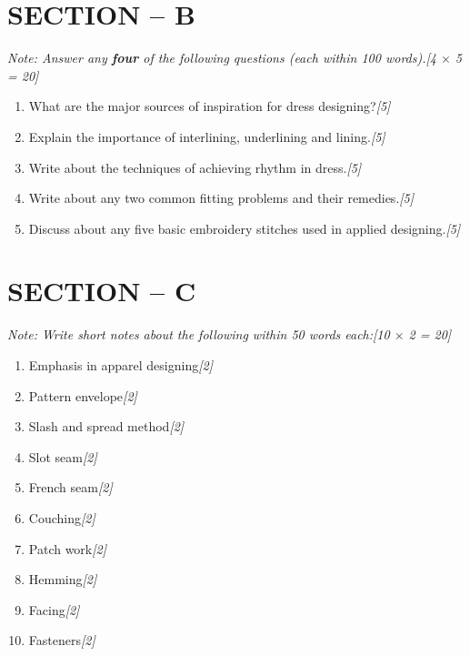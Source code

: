 \documentclass[11pt,a4paper]{article}
\newcommand{\pts}[1]{\hfill \textit{[#1]}}
\begin{document}
\bigskip

\section*{SECTION -- B}
\noindent \textit{Note: Answer any \textbf{four} of the following questions (each within 100 words).}\pts{4 $\times$ 5 = 20}

\begin{enumerate}[label=\textbf{\arabic*.},leftmargin=*,start=6,itemsep=8pt]

  \item What are the major sources of inspiration for dress designing?\pts{5}

  \item Explain the importance of interlining, underlining and lining.\pts{5}

  \item Write about the techniques of achieving rhythm in dress.\pts{5}

  \item Write about any two common fitting problems and their remedies.\pts{5}

  \item Discuss about any five basic embroidery stitches used in applied designing.\pts{5}

\end{enumerate}

\bigskip

\section*{SECTION -- C}
\noindent \textit{Note: Write short notes about the following within 50 words each:}\pts{10 $\times$ 2 = 20}

\begin{enumerate}[label=\textbf{11.}(\alph*),leftmargin=*,itemsep=6pt]

  \item Emphasis in apparel designing\pts{2}
  \item Pattern envelope\pts{2}
  \item Slash and spread method\pts{2}
  \item Slot seam\pts{2}
  \item French seam\pts{2}
  \item Couching\pts{2}
  \item Patch work\pts{2}
  \item Hemming\pts{2}
  \item Facing\pts{2}
  \item Fasteners\pts{2}

\end{enumerate}
\end{document}
